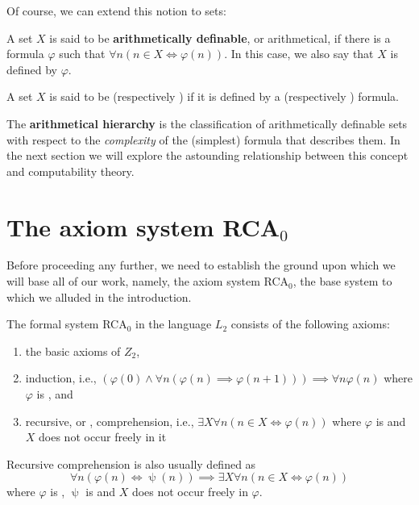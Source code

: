 \documentclass[../main.tex]{memoir}
\begin{document}
Of course, we can extend this notion to sets:

\begin{definition}
  A set $X$ is said to be \textbf{arithmetically definable}, or arithmetical, if there is a formula $\varphi$ such that $\forall n (n \in X \iff \varphi(n))$. In this case, we also say that $X$ is defined by $\varphi$.
\end{definition}

\begin{definition}
  A set $X$ is said to be  (respectively ) if it is defined by a  (respectively ) formula.
\end{definition}

The \textbf{arithmetical hierarchy} is the classification of arithmetically definable sets with respect to the \textit{complexity} of the (simplest) formula that describes them. In the next section we will explore the astounding relationship between this concept and computability theory.

\section{The axiom system RCA$_0$}

Before proceeding any further, we need to establish the ground upon which we will base all of our work, namely, the axiom system RCA$_0$, the base system to which we alluded in the introduction.

The formal system RCA$_0$ in the language $L_2$ consists of the following axioms:

\begin{enumerate}
\item the basic axioms of $Z_2$,
\item \re  induction, i.e., $(\varphi(0) \land \forall n (\varphi(n) \implies \varphi(n + 1))) \implies \forall n \varphi(n)$ where $\varphi$ is \re, and
\item recursive, or \rec, comprehension, i.e., $\exists X \forall n (n \in X \iff \varphi(n))$ where $\varphi$ is \rec and $X$ does not occur freely in it
\end{enumerate}

Recursive comprehension is also usually defined as
\[
  \forall n (\varphi(n) \iff \uppsi(n)) \implies \exists X \forall n (n \in X \iff \varphi(n))
\]
where $\varphi$ is \re, $\uppsi$ is \core and $X$ does not occur freely in $\varphi$. \\
\end{document}
